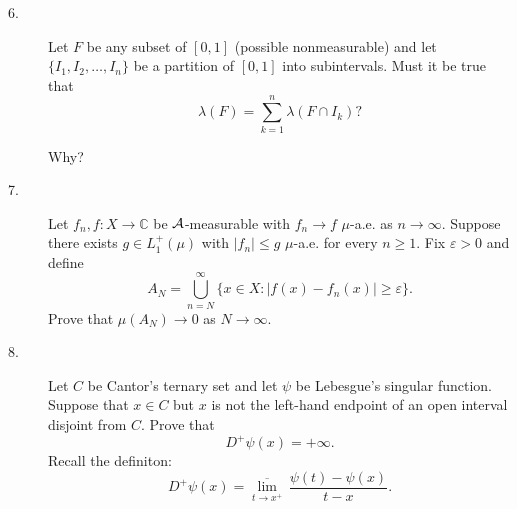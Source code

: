\documentclass{article}
\def\C{\mathbb C}
\begin{document}
\begin{description}
\item[6.]
Let $F$ be any subset of $[0,1]$ (possible nonmeasurable) and let
$\{I_1, I_2, \dots, I_n\}$ be a partition of $[0,1]$ into subintervals. Must
it be true that
$$\lambda (F) = \sum^n_{k=1} \lambda (F \cap I_k)?$$

Why?

\item[7.]
Let $f_n, f: X \to \C$ be ${\cal A}$-measurable with $f_n \to f$ $\mu$-a.e.
as $n \to \infty$. Suppose there exists $g \in L^+_1 (\mu)$ with
$|f_n| \leq g$ $\mu$-a.e. for every $n\geq 1$. Fix $\varepsilon >0$ and
define
$$A_N = \bigcup^\infty_{n=N} \{x \in X: |f(x) - f_n (x)| \geq \varepsilon\}.$$
Prove that $\mu(A_N) \to 0$ as $N \to \infty$.

\item[8.]
Let $C$ be Cantor's ternary set and let $\psi$ be Lebesgue's singular function.
Suppose that $x \in C$ but $x$ is not the left-hand endpoint of an open
interval disjoint from $C$. Prove that
$$D^+ \psi (x) = +\infty.$$
Recall the definiton:
$$D^+ \psi (x) = \overline{\lim_{t\to x^+}}
 \, \frac{\psi (t) - \psi (x)}{t-x}.$$







\end{description}    
\end{document}
